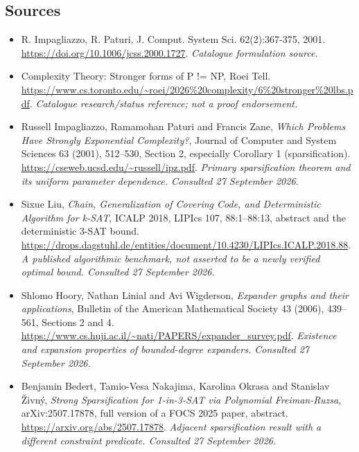\documentclass[11pt,a4paper]{article}
\numberwithin{equation}{section}
\begin{document}
\subsection{Sources}
\begin{itemize}\raggedright
\item[\textnormal{[S1]}]\hypertarget{source:statement:1}{} R. Impagliazzo, R. Paturi, J. Comput. System Sci. 62(2):367-375, 2001.
\url{https://doi.org/10.1006/jcss.2000.1727}.
{\small\textit{Catalogue formulation source.}}
\item[\textnormal{[S2]}]\hypertarget{source:statement:2}{} Complexity Theory: Stronger forms of P != NP, Roei Tell.
\url{https://www.cs.toronto.edu/~roei/2026%20complexity/6%20stronger%20lbs.pdf}.
{\small\textit{Catalogue research/status reference; not a proof endorsement.}}
\item[\textnormal{[E1]}]\hypertarget{extra:statement:1}{} Russell Impagliazzo, Ramamohan Paturi and Francis Zane,
\emph{Which Problems Have Strongly Exponential Complexity?}, Journal of Computer and System Sciences
63 (2001), 512--530, Section 2, especially Corollary 1 (sparsification).
\url{https://cseweb.ucsd.edu/~russell/ipz.pdf}.
{\small\textit{Primary sparsification theorem and its uniform parameter dependence. Consulted 27 September 2026.}}
\item[\textnormal{[E2]}]\hypertarget{extra:statement:2}{} Sixue Liu,
\emph{Chain, Generalization of Covering Code, and Deterministic Algorithm for k-SAT},
ICALP 2018, LIPIcs 107, 88:1--88:13, abstract and the deterministic $3$-SAT bound.
\url{https://drops.dagstuhl.de/entities/document/10.4230/LIPIcs.ICALP.2018.88}.
{\small\textit{A published algorithmic benchmark, not asserted to be a newly verified optimal bound. Consulted 27 September 2026.}}
\item[\textnormal{[E3]}]\hypertarget{extra:statement:3}{} Shlomo Hoory, Nathan Linial and Avi Wigderson,
\emph{Expander graphs and their applications}, Bulletin of the American Mathematical Society
43 (2006), 439--561, Sections 2 and 4.
\url{https://www.cs.huji.ac.il/~nati/PAPERS/expander_survey.pdf}.
{\small\textit{Existence and expansion properties of bounded-degree expanders. Consulted 27 September 2026.}}
\item[\textnormal{[E4]}]\hypertarget{extra:statement:4}{} Benjamin Bedert, Tamio-Vesa Nakajima, Karolina Okrasa and Stanislav \v{Z}ivn\'y,
\emph{Strong Sparsification for 1-in-3-SAT via Polynomial Freiman-Ruzsa},
arXiv:2507.17878, full version of a FOCS 2025 paper, abstract.
\url{https://arxiv.org/abs/2507.17878}.
{\small\textit{Adjacent sparsification result with a different constraint predicate. Consulted 27 September 2026.}}
\end{itemize}
\end{document}
